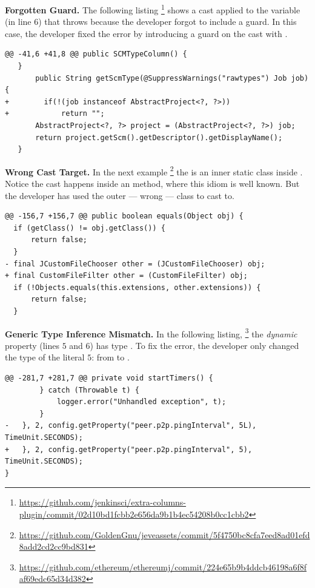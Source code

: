 \textbf{Forgotten Guard.}
The following listing%
\footnote{\url{https://github.com/jenkinsci/extra-columns-plugin/commit/02d10bd1fcbb2e656da9b1b4ec54208b0cc1cbb2}}
shows a cast applied to the variable  (in line $6$)
that throws  because the developer forgot to include a guard.
In this case, the developer fixed the error by introducing a guard on the cast with .

\begin{lstlisting}[style=java]
@@ -41,6 +41,8 @@ public SCMTypeColumn() {
   }
       public String getScmType(@SuppressWarnings("rawtypes") Job job) {
+        if(!(job instanceof AbstractProject<?, ?>))
+            return "";
       AbstractProject<?, ?> project = (AbstractProject<?, ?>) job;
       return project.getScm().getDescriptor().getDisplayName();
   }
\end{lstlisting}

\textbf{Wrong Cast Target.}
In the next example%
\footnote{\url{https://github.com/GoldenGnu/jeveassets/commit/5f4750bc8cfa7eed8ad01efd8add2cd2cc9bd831}}
the  is an inner static class inside .
Notice the cast happens inside an  method, where this idiom is well known.
But the developer has used the outer --- wrong --- class to cast to.

\begin{lstlisting}[style=java]
@@ -156,7 +156,7 @@ public boolean equals(Object obj) {
  if (getClass() != obj.getClass()) {
      return false;
  }
- final JCustomFileChooser other = (JCustomFileChooser) obj;
+ final CustomFileFilter other = (CustomFileFilter) obj;
  if (!Objects.equals(this.extensions, other.extensions)) {
      return false;
  }
\end{lstlisting}

\textbf{Generic Type Inference Mismatch.}
In the following listing,%
\footnote{\url{https://github.com/ethereum/ethereumj/commit/224e65b9b4ddcb46198a6f8faf69edc65d34d382}}
the \emph{dynamic} property 
(lines $5$ and $6$) has type .
To fix the error, the developer only changed the type of the
literal $5$: from  to .

\begin{lstlisting}[style=java]
@@ -281,7 +281,7 @@ private void startTimers() {
        } catch (Throwable t) {
            logger.error("Unhandled exception", t);
        }
-   }, 2, config.getProperty("peer.p2p.pingInterval", 5L), TimeUnit.SECONDS);
+   }, 2, config.getProperty("peer.p2p.pingInterval", 5), TimeUnit.SECONDS);
}
\end{lstlisting}

